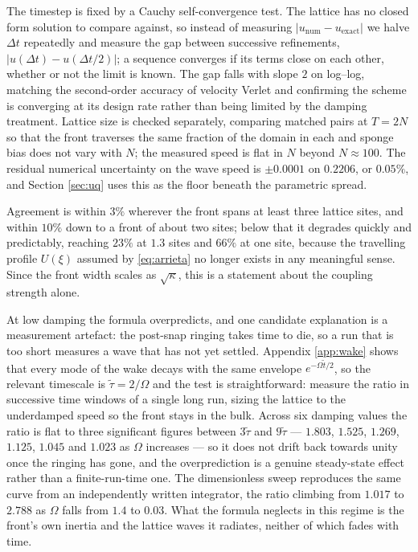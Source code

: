 The timestep is fixed by a Cauchy self-convergence test. The lattice has no closed
form solution to compare against, so instead of measuring $|u_{\text{num}} -
u_{\text{exact}}|$ we halve $\Delta t$ repeatedly and measure the gap between
successive refinements, $|u(\Delta t) - u(\Delta t/2)|$; a sequence converges if
its terms close on each other, whether or not the limit is known. The gap falls
with slope $2$ on log--log, matching the second-order accuracy of velocity Verlet
and confirming the scheme is converging at its design rate rather than being
limited by the damping treatment. Lattice size is checked separately, comparing
matched pairs at $T = 2N$ so that the front traverses the same fraction of the
domain in each and sponge bias does not vary with $N$; the measured speed is flat
in $N$ beyond $N \approx 100$. The residual numerical uncertainty on the wave
speed is $\pm0.0001$ on $0.2206$, or $0.05\%$, and Section \ref{sec:uq} uses this
as the floor beneath the parametric spread.



Agreement is within $3\%$ wherever the front spans at least three lattice sites,
and within $10\%$ down to a front of about two sites; below that it degrades
quickly and predictably, reaching $23\%$ at $1.3$ sites and $66\%$ at one site,
because the travelling profile $U(\xi)$ assumed by \eqref{eq:arrieta} no longer
exists in any meaningful sense. Since the front width scales as $\sqrt{\kappa}$,
this is a statement about the coupling strength alone.

At low damping the formula overpredicts, and one candidate explanation is a
measurement artefact: the post-snap ringing takes time to die, so a run that is
too short measures a wave that has not yet settled. Appendix \ref{app:wake} shows
that every mode of the wake decays with the same envelope $e^{-\Omega\tilde t/2}$,
so the relevant timescale is $\tilde\tau = 2/\Omega$ and the test is
straightforward: measure the ratio in successive time windows of a single long
run, sizing the lattice to the underdamped speed so the front stays in the bulk.
Across six damping values the ratio is flat to three significant figures between
$3\tilde\tau$ and $9\tilde\tau$ --- $1.803$, $1.525$, $1.269$, $1.125$, $1.045$
and $1.023$ as $\Omega$ increases --- so it does not drift back towards unity once
the ringing has gone, and the overprediction is a genuine steady-state effect
rather than a finite-run-time one. The dimensionless sweep reproduces the same
curve from an independently written integrator, the ratio climbing from $1.017$ to
$2.788$ as $\Omega$ falls from $1.4$ to $0.03$. What the formula neglects in this
regime is the front's own inertia and the lattice waves it radiates, neither of
which fades with time.


